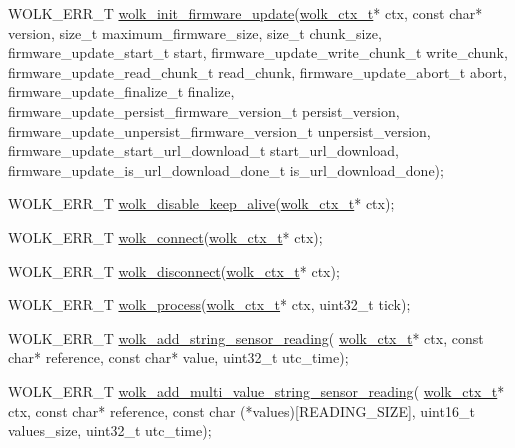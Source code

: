 \begin{DoxyCodeInclude}
WOLK\_ERR\_T \hyperlink{wolk__connector_8h_a077b59e55a348cd2601bb269a04c77d6}{wolk\_init\_firmware\_update}(\hyperlink{structwolk__ctx}{wolk\_ctx\_t}* ctx, \textcolor{keyword}{const} \textcolor{keywordtype}{char}* 
      version, \textcolor{keywordtype}{size\_t} maximum\_firmware\_size,
                                     \textcolor{keywordtype}{size\_t} chunk\_size, firmware\_update\_start\_t start,
                                     firmware\_update\_write\_chunk\_t write\_chunk, 
      firmware\_update\_read\_chunk\_t read\_chunk,
                                     firmware\_update\_abort\_t abort, firmware\_update\_finalize\_t finalize,
                                     firmware\_update\_persist\_firmware\_version\_t persist\_version,
                                     firmware\_update\_unpersist\_firmware\_version\_t unpersist\_version,
                                     firmware\_update\_start\_url\_download\_t start\_url\_download,
                                     firmware\_update\_is\_url\_download\_done\_t is\_url\_download\_done);

WOLK\_ERR\_T \hyperlink{wolk__connector_8h_ac04ee6d0e9cac773f77a57b89383c715}{wolk\_disable\_keep\_alive}(\hyperlink{structwolk__ctx}{wolk\_ctx\_t}* ctx);

WOLK\_ERR\_T \hyperlink{wolk__connector_8h_ab246fad03ad57f3efe89f4ec2c93a288}{wolk\_connect}(\hyperlink{structwolk__ctx}{wolk\_ctx\_t}* ctx);

WOLK\_ERR\_T \hyperlink{wolk__connector_8h_af174943365b8cddc1e6e9351996805c3}{wolk\_disconnect}(\hyperlink{structwolk__ctx}{wolk\_ctx\_t}* ctx);

WOLK\_ERR\_T \hyperlink{wolk__connector_8h_a57a05d76cc96bc5de0ee0e9a23ca5a8e}{wolk\_process}(\hyperlink{structwolk__ctx}{wolk\_ctx\_t}* ctx, uint32\_t tick);

WOLK\_ERR\_T \hyperlink{wolk__connector_8h_a5588d57c8ff9d6138f418803bbe064fb}{wolk\_add\_string\_sensor\_reading}(
      \hyperlink{structwolk__ctx}{wolk\_ctx\_t}* ctx, \textcolor{keyword}{const} \textcolor{keywordtype}{char}* reference, \textcolor{keyword}{const} \textcolor{keywordtype}{char}* value, uint32\_t utc\_time);

WOLK\_ERR\_T \hyperlink{wolk__connector_8h_a4a7c8f7b4ead8006d8330e4bba64f6ec}{wolk\_add\_multi\_value\_string\_sensor\_reading}(
      \hyperlink{structwolk__ctx}{wolk\_ctx\_t}* ctx, \textcolor{keyword}{const} \textcolor{keywordtype}{char}* reference,
                                                      \textcolor{keyword}{const} \textcolor{keywordtype}{char} (*values)[READING\_SIZE], uint16\_t 
      values\_size,
                                                      uint32\_t utc\_time);


\end{DoxyCodeInclude}
